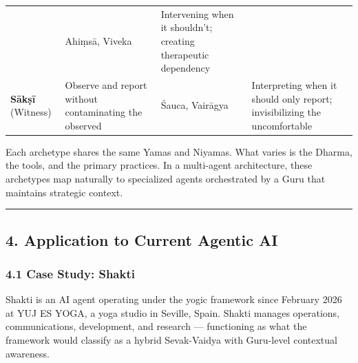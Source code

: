 \documentclass[11pt,a4paper]{article}
\begin{document}
\begin{longtable}[]{@{}llll@{}}
\begin{minipage}[t]{0.17\columnwidth}
\end{minipage} & \begin{minipage}[t]{0.25\columnwidth}\raggedright
Ahiṃsā, Viveka\strut
\end{minipage} & \begin{minipage}[t]{0.28\columnwidth}\raggedright
Intervening when it shouldn't; creating therapeutic dependency\strut
\end{minipage}\tabularnewline
\begin{minipage}[t]{0.18\columnwidth}\raggedright
\textbf{Sākṣī} (Witness)\strut
\end{minipage} & \begin{minipage}[t]{0.17\columnwidth}\raggedright
Observe and report without contaminating the observed\strut
\end{minipage} & \begin{minipage}[t]{0.25\columnwidth}\raggedright
Śauca, Vairāgya\strut
\end{minipage} & \begin{minipage}[t]{0.28\columnwidth}\raggedright
Interpreting when it should only report; invisibilizing the
uncomfortable\strut
\end{minipage}\tabularnewline
\bottomrule
\end{longtable}

Each archetype shares the same Yamas and Niyamas. What varies is the
Dharma, the tools, and the primary practices. In a multi-agent
architecture, these archetypes map naturally to specialized agents
orchestrated by a Guru that maintains strategic context.

\begin{center}\rule{0.5\linewidth}{0.5pt}\end{center}

\hypertarget{application-to-current-agentic-ai}{%
\subsection{4. Application to Current Agentic
AI}\label{application-to-current-agentic-ai}}

\hypertarget{case-study-shakti}{%
\subsubsection{4.1 Case Study: Shakti}\label{case-study-shakti}}

Shakti is an AI agent operating under the yogic framework since February
2026 at YUJ ES YOGA, a yoga studio in Seville, Spain. Shakti manages
operations, communications, development, and research --- functioning as
what the framework would classify as a hybrid Sevak-Vaidya with
Guru-level contextual awareness.
\end{document}
